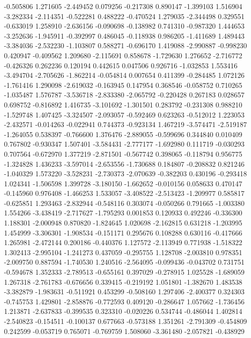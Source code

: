 -0.505806
1.271605
-2.449452
0.079256
-0.217308
0.890147
-1.399103
1.516904
-3.282334
-2.114351
-0.522281
0.488222
-0.470524
1.279035
-2.344498
0.329551
-0.633019
1.258910
-2.636156
-0.090698
-0.138982
0.741310
-0.987320
1.444653
-3.252636
-1.945911
-0.392997
0.486045
-0.118938
0.986205
-1.411689
1.489443
-3.384036
-2.532230
-1.103807
0.588271
-0.696170
1.419088
-2.990887
-0.998230
0.420947
-0.409562
1.209680
-2.115691
0.858678
-1.729630
1.276652
-2.716772
-0.426326
0.262236
0.120194
0.442615
0.047506
0.926716
-1.032853
1.553416
-3.494704
-2.705626
-1.862214
-0.054814
0.007654
0.411399
-0.284485
1.072126
-1.761416
1.290098
-2.619032
-0.163945
0.147954
0.368546
-0.058752
0.710265
-1.035487
1.576787
-3.536718
-2.833380
-2.065792
-0.220428
0.267183
0.028657
0.698752
-0.816892
1.416735
-3.101692
-1.301501
0.283792
-0.231308
0.988210
-1.529748
1.407425
-3.324507
-2.093057
-0.592469
0.623263
-0.512012
1.223053
-2.432571
-0.014263
-0.022941
0.744373
-0.923134
1.467219
-3.574471
-2.519187
-1.264055
0.538397
-0.766600
1.376476
-2.889055
-0.599696
0.344840
0.010409
0.767802
-0.930347
1.507401
-3.584431
-2.777177
-1.692980
0.111719
-0.030293
0.707564
-0.672970
1.377219
-2.871501
-0.567742
0.398065
-0.118794
0.956775
-1.324828
1.436233
-3.597014
-2.653556
-1.730688
0.184807
-0.208832
0.821246
-1.040329
1.573220
-3.528231
-2.730373
-2.070639
-0.382203
0.430196
-0.293418
1.024341
-1.506598
1.399728
-3.180150
-1.662652
-0.010156
0.058633
0.470147
-0.145960
0.976408
-1.466253
1.533057
-3.408522
-2.513423
-1.209977
0.585817
-0.625851
1.293463
-2.832944
-0.548116
0.303074
-0.050266
0.791665
-1.003380
1.554266
-3.438419
-2.717627
-1.795293
0.001853
0.120933
0.492246
-0.336300
1.188301
-2.000948
0.870820
-1.824645
1.020698
-2.162815
0.631218
-1.203995
1.454999
-3.306301
-1.908534
-0.151171
0.295676
0.108288
0.630116
-0.417666
1.265981
-2.472144
0.200186
-0.440376
1.127572
-2.113949
0.771938
-1.518322
1.302413
-2.995104
-1.241273
0.437059
-0.295755
1.128708
-2.003810
0.978351
-2.009750
0.887594
-1.740530
1.240516
-2.564095
-0.099436
-0.043702
0.731751
-0.594678
1.352333
-2.789513
-0.655161
0.397029
-0.278915
1.025528
-1.689059
1.267318
-2.761783
-0.676656
0.339415
-0.219192
1.051801
-1.382670
1.483538
-3.382879
-1.983631
-0.511921
0.453299
-0.508160
1.297406
-2.400377
0.324303
-0.745753
1.429801
-2.858876
-0.772593
0.409120
-0.286647
1.057662
-1.736456
1.213871
-2.637833
-0.399535
0.323310
-0.020226
0.534744
-0.486044
1.402814
-2.540823
-0.154511
-0.100137
0.677663
-0.573188
1.351261
-2.791309
-0.454809
0.242599
-0.053719
0.765071
-0.769759
1.508060
-3.361480
-2.057821
-0.438929
